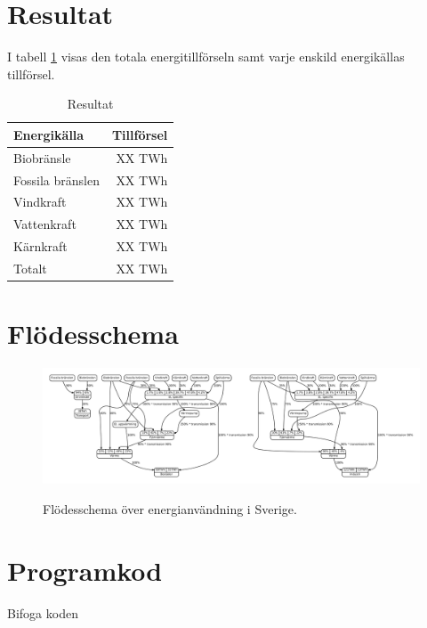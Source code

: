 \documentclass[a4paper,11pt,fleqn, titlepage]{article}
\begin{document}
\section{Resultat}

I tabell \ref{resultat} visas den totala energitillförseln samt varje
enskild energikällas tillförsel.
\begin{table}[h!]
	\centering
	\begin{tabular}{| l | r |}
		\hline
		Energikälla      & Tillförsel \\ \hline
		Biobränsle       & XX TWh \\
		Fossila bränslen & XX TWh \\
		Vindkraft        & XX TWh \\
		Vattenkraft      & XX TWh \\
		Kärnkraft        & XX TWh \\ \hline
		Totalt           & XX TWh \\ \hline
	\end{tabular}
	\caption{Resultat}
	\label{resultat}
\end{table}


\newpage
\appendix

\section{Flödesschema}
\begin{figure}[h!]
	\centering 
	\vspace*{0cm}
	\includegraphics[width=0.6\paperheight,angle=270]{diagram.pdf}
	\label{app:schema}
	\caption{Flödesschema över energianvändning i Sverige.}
\end{figure}

\newpage

\section{Programkod}
Bifoga koden
\end{document}
